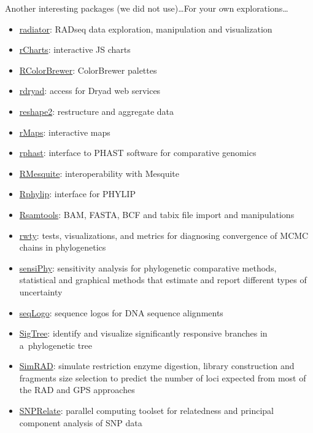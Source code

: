 \documentclass[compress, ucs, xelatex, 11pt, xcolor=svgnames, aspectratio=169,
	hyperref={
		bookmarks=true,
		unicode=true,
		colorlinks=true,
		pdftitle={Molecular data in R},
		plainpages=false,
		pdfauthor={Vojtech Zeisek},
		pdfsubject={Course about phylogeny and evolution in R},
		pdfcreator={XeLaTeX},
		pdfkeywords={R, evolution, phylogeny, molecular data},
		linkcolor=Crimson, %
		anchorcolor=Magenta, %
		citecolor=Magenta, %
		filecolor=Magenta, %
		menucolor=Magenta, %
		urlcolor=DodgerBlue, %
		pdftex},
	url={hyphens, lowtilde} %
	]{beamer}
\begin{document}
\begin{frame}[allowframebreaks]{Another interesting packages (we did not use)\ldots}{For your own explorations\ldots}
\begin{itemize}
		\item \href{https://github.com/thierrygosselin/radiator}{radiator}: RADseq data exploration, manipulation and visualization
		\item \href{https://github.com/ramnathv/rCharts}{rCharts}: interactive JS charts
		\item \href{https://CRAN.R-project.org/package=RColorBrewer}{RColorBrewer}: ColorBrewer palettes
		\item \href{https://CRAN.R-project.org/package=rdryad}{rdryad}: access for Dryad web services
		\item \href{https://CRAN.R-project.org/package=reshape2}{reshape2}: restructure and aggregate data
		\item \href{https://github.com/ramnathv/rMaps}{rMaps}: interactive maps
		\item \href{https://CRAN.R-project.org/package=rphast}{rphast}: interface to PHAST software for comparative genomics
		\item \href{https://r-forge.r-project.org/projects/rmesquite/}{RMesquite}: interoperability with Mesquite
		\item \href{https://CRAN.R-project.org/package=Rphylip}{Rphylip}: interface for PHYLIP
		\item \href{https://bioconductor.org/packages/release/bioc/html/Rsamtools.html}{Rsamtools}: BAM, FASTA, BCF and tabix file import and manipulations
		\item \href{https://CRAN.R-project.org/package=rwty}{rwty}: tests, visualizations, and metrics for diagnosing convergence of MCMC chains in phylogenetics
		\item \href{https://CRAN.R-project.org/package=sensiPhy}{sensiPhy}: sensitivity analysis for phylogenetic comparative methods,  statistical and graphical methods that estimate and report different types of uncertainty
		\item \href{https://www.bioconductor.org/packages/release/bioc/html/seqLogo.html}{seqLogo}: sequence logos for DNA sequence alignments
		\item \href{https://CRAN.R-project.org/package=SigTree}{SigTree}: identify and visualize significantly responsive branches in a~phylogenetic tree
		\item \href{https://CRAN.R-project.org/package=SimRAD}{SimRAD}: simulate restriction enzyme digestion, library construction and fragments size selection to predict the number of loci expected from most of the RAD and GPS approaches
		\item \href{https://www.bioconductor.org/packages/release/bioc/html/SNPRelate.html}{SNPRelate}: parallel computing toolset for relatedness and principal component analysis of SNP data

\end{itemize}
\end{frame}
\end{document}
